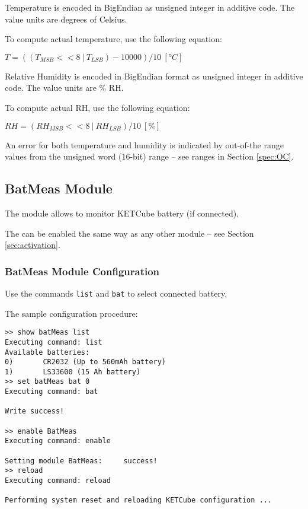   Temperature is encoded in BigEndian as unsigned integer in additive code. The value units are degrees of Celsius.
  
  To compute actual temperature, use the following equation:
  
  $T = ((T_{MSB} << 8 ~|~ T_{LSB}) - 10000) / 10 ~[°C]$
  
  Relative Humidity is encoded in BigEndian format as unsigned integer in additive code. The value units are \% RH.
  
  To compute actual RH, use the following equation:
  
  $RH = (RH_{MSB} << 8 ~|~ RH_{LSB}) / 10 ~[\%]$
  
  An error for both temperature and humidity is indicated by out-of-the range values from the unsigned word (16-bit) range -- see ranges in Section \ref{spec:OC}.

\clearpage
\subsection{BatMeas Module}
  
The  module allows to monitor KETCube battery (if connected). 

The  can be enabled the same way as any other module -- see Section \ref{sec:activation}.

\subsubsection{BatMeas Module Configuration}
  Use the commands {\tt list} and {\tt bat} to select connected battery.
  
  The sample configuration procedure:
  
\begin{docCodeExample}
\begin{verbatim}
>> show batMeas list
Executing command: list
Available batteries:
0)       CR2032 (Up to 560mAh battery)
1)       LS33600 (15 Ah battery)
>> set batMeas bat 0
Executing command: bat

Write success!

>> enable BatMeas
Executing command: enable

Setting module BatMeas:     success!
>> reload
Executing command: reload

Performing system reset and reloading KETCube configuration ...
\end{verbatim}
\end{docCodeExample}

